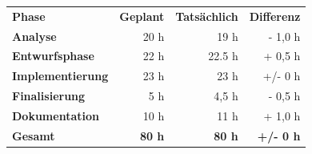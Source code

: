 \begin{tabular}{lrrr}
\rowcolor{heading}\textbf{Phase} & \textbf{Geplant} & \textbf{Tatsächlich} & \textbf{Differenz} \\
\textbf{Analyse} & 20 h  & 19 h  & - 1,0 h \\
\rowcolor{odd}\textbf{Entwurfsphase} & 22 h   & 22.5 h  & + 0,5 h \\
\textbf{Implementierung} & 23 h  & 23 h  & +/- 0 h \\
\rowcolor{odd}\textbf{Finalisierung} & 5 h   & 4,5 h   & - 0,5 h\\
\textbf{Dokumentation} & 10 h   & 11 h   & + 1,0 h \\
\hline
\hline
\rowcolor{odd}\textbf{Gesamt} & \textbf{80 h}  & \textbf{80 h}  & \textbf{+/- 0 h} \\
\end{tabular}
